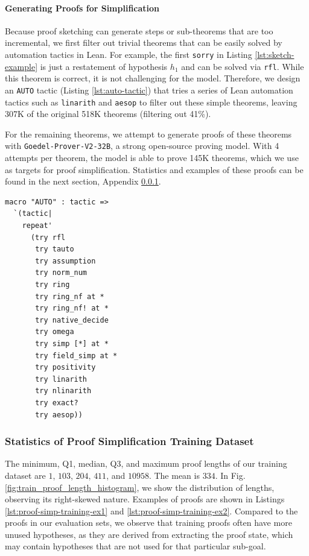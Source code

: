 \paragraph{Generating Proofs for Simplification} Because proof sketching can generate steps or sub-theorems that are too incremental, we first filter out trivial theorems that can be easily solved by automation tactics in Lean. For example, the first \texttt{sorry} in Listing \ref{lst:sketch-example} is just a restatement of hypothesis $h_1$ and can be solved via \texttt{rfl}. While this theorem is correct, it is not challenging for the model. Therefore, we design an \texttt{AUTO} tactic (Listing \ref{lst:auto-tactic}) that tries a series of Lean automation tactics such as \texttt{linarith} and \texttt{aesop} to filter out these simple theorems, leaving 307K of the original 518K theorems (filtering out 41\%).

For the remaining theorems, we attempt to generate proofs of these theorems with \texttt{Goedel-Prover-V2-32B}, a strong open-source proving model. With 4 attempts per theorem, the model is able to prove 145K theorems, which we use as targets for proof simplification. Statistics and examples of these proofs can be found in the next section, Appendix \ref{sec:proof-simp-training-stats}.

\begin{tcolorbox}[colback=lightblue, boxrule=0pt, arc=5pt, outer arc=5pt, after skip=10pt plus 2pt]
\begin{lstlisting}[caption={AUTO tactic for filtering trivial theorems},label={lst:auto-tactic}, captionpos=t, language=lean, breaklines=true, style=mystyle]
macro "AUTO" : tactic =>
  `(tactic|
    repeat'
      (try rfl
       try tauto
       try assumption
       try norm_num
       try ring
       try ring_nf at *
       try ring_nf! at *
       try native_decide
       try omega
       try simp [*] at *
       try field_simp at *
       try positivity
       try linarith
       try nlinarith
       try exact?
       try aesop))
\end{lstlisting}
\end{tcolorbox}


\subsubsection{Statistics of Proof Simplification Training Dataset} \label{sec:proof-simp-training-stats}

The minimum, Q1, median, Q3, and maximum proof lengths of our training dataset are $1$, $103$, $204$, $411$, and $10958$. The mean is $334$. In Fig. \ref{fig:train_proof_length_histogram}, we show the distribution of lengths, observing its right-skewed nature. Examples of proofs are shown in Listings \ref{lst:proof-simp-training-ex1} and \ref{lst:proof-simp-training-ex2}. Compared to the proofs in our evaluation sets, we observe that training proofs often have more unused hypotheses, as they are derived from extracting the proof state, which may contain hypotheses that are not used for that particular sub-goal. 

